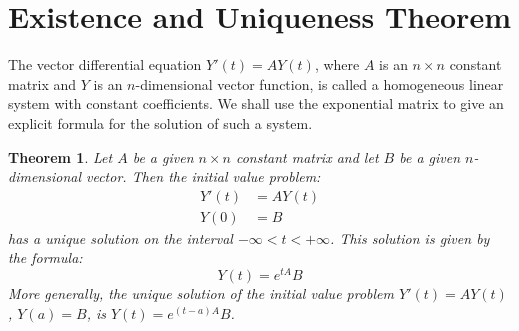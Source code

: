 \documentclass[12pt,a4paper]{report}
\newtheorem{theorem}{Theorem}[chapter]
\theoremstyle{definition}
\numberwithin{equation}{chapter}
\begin{document}
\section{Existence and Uniqueness Theorem}
The vector differential equation $Y'(t) = AY(t)$, where $A$ is an $n \times n$ constant matrix and $Y$ is an $n$-dimensional vector function, is called a homogeneous linear system with constant coefficients. We shall use the exponential matrix to give an explicit formula for the solution of such a system.

\begin{theorem}
Let $A$ be a given $n \times n$ constant matrix and let $B$ be a given $n$-dimensional vector. Then the initial value problem:
\begin{equation}
\begin{aligned}
Y'(t) &= AY(t) \\
Y(0) &= B
\end{aligned}
\end{equation}
has a unique solution on the interval $-\infty < t < +\infty$. This solution is given by the formula:
\begin{equation}
Y(t) = e^{tA}B
\end{equation}
More generally, the unique solution of the initial value problem $Y'(t) = AY(t)$, $Y(a) = B$, is $Y(t) = e^{(t-a)A}B$.
\end{theorem}
\end{document}
